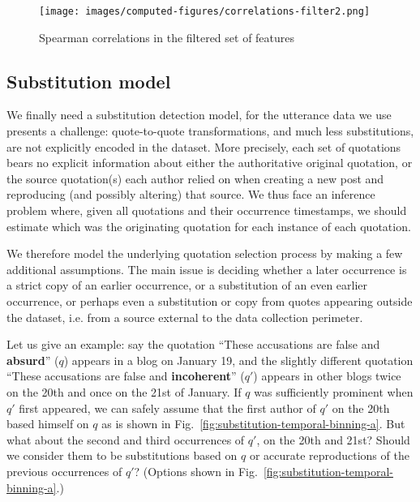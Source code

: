 \begin{figure}[!th]
    \centering
    \texttt{[image: images/computed-figures/correlations-filter2.png]}
    \caption{Spearman correlations in the filtered set of features}
    \label{fig:feature-corrs-filtered}
\end{figure}


\subsection{Substitution model}
\label{sec:temporal-binning}\label{sec:model}

We finally need a substitution detection model, for the utterance data we use presents a challenge: quote-to-quote transformations, and much less substitutions, are not explicitly encoded in the dataset. More precisely, each set of quotations bears no explicit information about either the authoritative original quotation, or the source quotation(s) each author relied on when creating a new post and reproducing (and possibly altering) that source.
We thus face an inference problem where, given all quotations and their occurrence timestamps, we should estimate which was the originating quotation for each instance of each quotation.

We therefore model the underlying quotation selection process by making a few additional assumptions. %
The main issue is deciding whether a later occurrence is a strict copy of an earlier occurrence, or a substitution of an even earlier occurrence, or perhaps even a substitution or copy from quotes appearing outside the dataset, \hbox{i.e.} from a source external to the data collection perimeter.

Let us give an example: say the quotation ``These accusations are false and \textbf{absurd}'' ($q$) appears in a blog on January 19, and the slightly different quotation ``These accusations are false and \textbf{incoherent}'' ($q'$) appears in other blogs twice on the 20th and once on the 21st of January.
If $q$ was sufficiently prominent when $q'$ first appeared, we can safely assume that the first author of $q'$ on the 20th based himself on $q$ as is shown in Fig.~\ref{fig:substitution-temporal-binning-a}.
But what about the second and third occurrences of $q'$, on the 20th and 21st?
Should we consider them to be substitutions based on $q$ %
or accurate reproductions of the previous occurrences of $q'$? (Options shown in Fig.~\ref{fig:substitution-temporal-binning-a}.)

